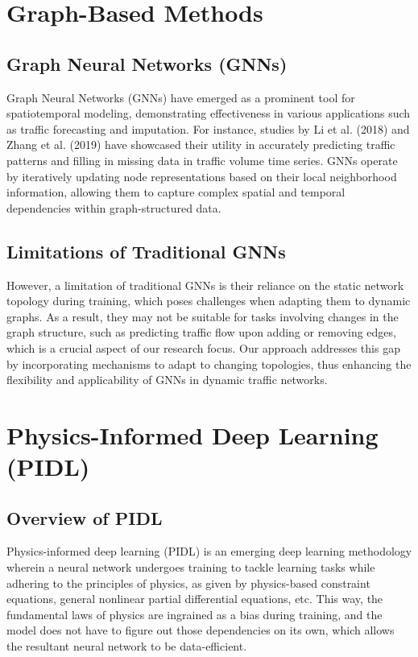 \section{Graph-Based Methods}
\subsection{Graph Neural Networks (GNNs)}
Graph Neural Networks (GNNs) \cite{gnn} have emerged as a prominent tool for spatiotemporal modeling, demonstrating effectiveness in various applications such as traffic forecasting and imputation. For instance, studies by Li et al. (2018) and Zhang et al. (2019) have showcased their utility in accurately predicting traffic patterns and filling in missing data in traffic volume time series. GNNs operate by iteratively updating node representations based on their local neighborhood information, allowing them to capture complex spatial and temporal dependencies within graph-structured data.

\subsection{Limitations of Traditional GNNs}
However, a limitation of traditional GNNs is their reliance on the static network topology during training, which poses challenges when adapting them to dynamic graphs. As a result, they may not be suitable for tasks involving changes in the graph structure, such as predicting traffic flow upon adding or removing edges, which is a crucial aspect of our research focus. Our approach addresses this gap by incorporating mechanisms to adapt to changing topologies, thus enhancing the flexibility and applicability of GNNs in dynamic traffic networks.

\section{Physics-Informed Deep Learning (PIDL)}
\subsection{Overview of PIDL}
Physics-informed deep learning (PIDL) \cite{raissi2017physics} is an emerging deep learning methodology wherein a neural network undergoes training to tackle learning tasks while adhering to the principles of physics, as given by physics-based constraint equations, general nonlinear partial differential equations, etc. This way, the fundamental laws of physics are ingrained as a bias during training, and the model does not have to figure out those dependencies on its own, which allows the resultant neural network to be data-efficient.

